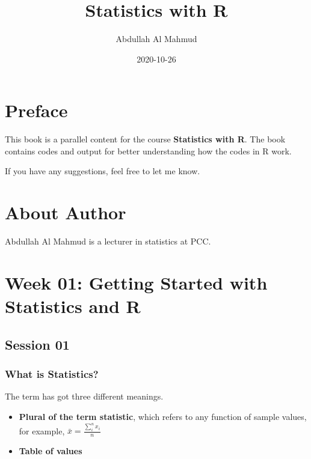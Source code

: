 \documentclass[
]{book}
\title{Statistics with R}
\author{Abdullah Al Mahmud}
\date{2020-10-26}
\providecommand{\tightlist}{%
  \setlength{\itemsep}{0pt}\setlength{\parskip}{0pt}}
\begin{document}
\maketitle

{
\setcounter{tocdepth}{1}
\tableofcontents
}
\hypertarget{preface}{%
\chapter*{Preface}\label{preface}}

This book is a parallel content for the course \textbf{Statistics with R}. The book contains codes and output for better understanding how the codes in R work.

If you have any suggestions, feel free to let me know.

\hypertarget{about-author}{%
\chapter*{About Author}\label{about-author}}

Abdullah Al Mahmud is a lecturer in statistics at PCC.

\hypertarget{start}{%
\chapter{Week 01: Getting Started with Statistics and R}\label{start}}

\hypertarget{session-01}{%
\section{Session 01}\label{session-01}}

\hypertarget{what-is-statistics}{%
\subsection{What is Statistics?}\label{what-is-statistics}}

The term has got three different meanings.

\begin{itemize}
\tightlist
\item
  \textbf{Plural of the term statistic}, which refers to any function of sample values, for example, \(\bar x = \frac {\sum_i^n x_i} n\)
\item
  \textbf{Table of values}
\end{itemize}
\end{document}
